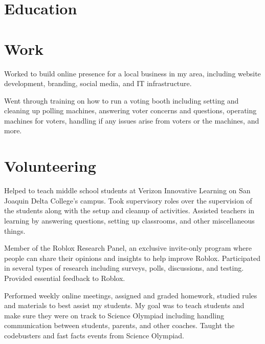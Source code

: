 \documentclass{my_cv}
\begin{document}

\section{Education}



\section{Work}

Worked to build online presence for a local business in my area, including website development, branding, social media, and IT infrastructure.

Went through training on how to run a voting booth including setting and cleaning up polling machines, answering voter concerns and questions, operating machines for voters, handling if any issues arise from voters or the machines, and more.

\section{Volunteering}

Helped to teach middle school students at Verizon Innovative Learning on San Joaquin Delta College's campus. Took supervisory roles over the supervision of the students along with the setup and cleanup of activities. Assisted teachers in learning by answering questions, setting up classrooms, and other miscellaneous things.

Member of the Roblox Research Panel, an exclusive invite-only program where people can share their opinions and insights to help improve Roblox. Participated in several types of research including surveys, polls, discussions, and testing. Provided essential feedback to Roblox.

Performed weekly online meetings, assigned and graded homework, studied rules and materials to best assist my students. My goal was to teach students and make sure they were on track to Science Olympiad including handling communication between students, parents, and other coaches. Taught the codebusters and fast facts events from Science Olympiad.
\end{document}
